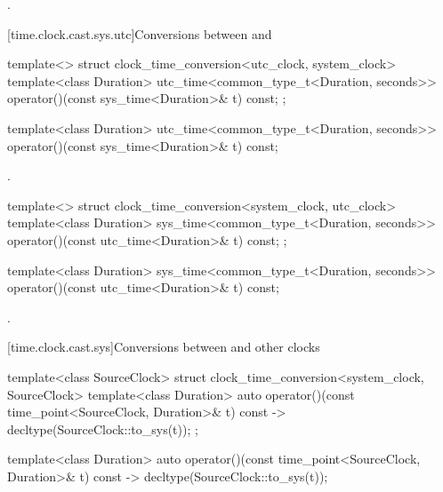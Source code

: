 \begin{itemdescr}
\pnum
\returns {}.
\end{itemdescr}

[time.clock.cast.sys.utc]{Conversions between  and }

\begin{codeblock}
template<>
struct clock_time_conversion<utc_clock, system_clock> {
  template<class Duration>
    utc_time<common_type_t<Duration, seconds>>
      operator()(const sys_time<Duration>& t) const;
};
\end{codeblock}

%
\begin{itemdecl}
template<class Duration>
  utc_time<common_type_t<Duration, seconds>>
    operator()(const sys_time<Duration>& t) const;
\end{itemdecl}

\begin{itemdescr}
\pnum
\returns {}.
\end{itemdescr}

\begin{codeblock}
template<>
struct clock_time_conversion<system_clock, utc_clock> {
  template<class Duration>
    sys_time<common_type_t<Duration, seconds>>
      operator()(const utc_time<Duration>& t) const;
};
\end{codeblock}

%
\begin{itemdecl}
template<class Duration>
  sys_time<common_type_t<Duration, seconds>>
    operator()(const utc_time<Duration>& t) const;
\end{itemdecl}

\begin{itemdescr}
\pnum
\returns {}.
\end{itemdescr}

[time.clock.cast.sys]{Conversions between  and other clocks}

\begin{codeblock}
template<class SourceClock>
struct clock_time_conversion<system_clock, SourceClock> {
  template<class Duration>
    auto operator()(const time_point<SourceClock, Duration>& t) const
      -> decltype(SourceClock::to_sys(t));
};
\end{codeblock}

%
\begin{itemdecl}
template<class Duration>
  auto operator()(const time_point<SourceClock, Duration>& t) const
    -> decltype(SourceClock::to_sys(t));
\end{itemdecl}

